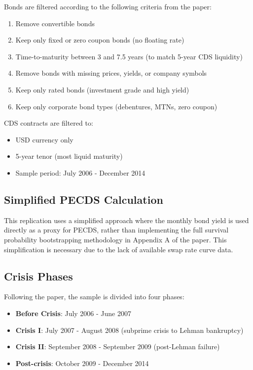 \documentclass{article}
\begin{document}
Bonds are filtered according to the following criteria from the paper:
\begin{enumerate}
    \item Remove convertible bonds
    \item Keep only fixed or zero coupon bonds (no floating rate)
    \item Time-to-maturity between 3 and 7.5 years (to match 5-year CDS liquidity)
    \item Remove bonds with missing prices, yields, or company symbols
    \item Keep only rated bonds (investment grade and high yield)
    \item Keep only corporate bond types (debentures, MTNs, zero coupon)
\end{enumerate}

CDS contracts are filtered to:
\begin{itemize}
    \item USD currency only
    \item 5-year tenor (most liquid maturity)
    \item Sample period: July 2006 - December 2014
\end{itemize}

\subsection{Simplified PECDS Calculation}

This replication uses a simplified approach where the monthly bond yield is used directly as a proxy for PECDS, rather than implementing the full survival probability bootstrapping methodology in Appendix A of the paper. This simplification is necessary due to the lack of available swap rate curve data.

\subsection{Crisis Phases}

Following the paper, the sample is divided into four phases:
\begin{itemize}
    \item \textbf{Before Crisis}: July 2006 - June 2007
    \item \textbf{Crisis I}: July 2007 - August 2008 (subprime crisis to Lehman bankruptcy)
    \item \textbf{Crisis II}: September 2008 - September 2009 (post-Lehman failure)
    \item \textbf{Post-crisis}: October 2009 - December 2014
\end{itemize}
\end{document}
